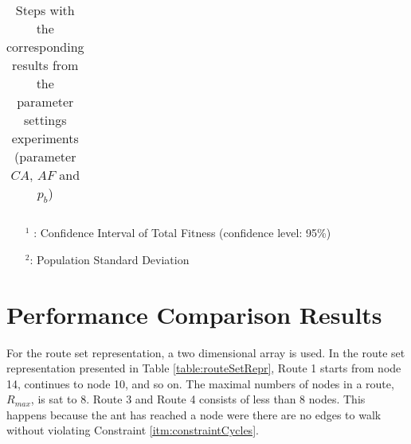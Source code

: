 \begin{table}
\begin{tabular}{|l|l|l|c||c|c|c|c|c|}
    \hline
    \end{tabular}
    \caption {Steps with the corresponding results from the parameter settings experiments (parameter $CA$, $AF$ and $p_b$)}
    \tiny
    \begin{itemize}[noitemsep]
    \item[$^1$ :] Confidence Interval of Total Fitness (confidence level: 95\%)
    \item[$^2$:] Population Standard Deviation 
    \end{itemize}
    \label{table:pm2}
\end{table}


\section{Performance Comparison Results}
\label{sec:performanceComparisonAppendix}

For the route set representation, a two dimensional array is used. In the route set representation presented in Table \vref{table:routeSetRepr}, Route 1 starts from node 14, continues to node 10, and so on. The maximal numbers of nodes in a route, $R_{max}$, is sat to 8. Route 3 and Route 4 consists of less than 8 nodes. This happens because the ant has reached a node were there are no edges to walk without violating Constraint \vref{itm:constraintCycles}.

